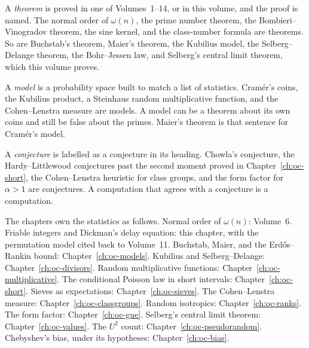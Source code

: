 A \emph{theorem} is proved in one of Volumes~1--14, or in this volume, and the proof is named. The normal order of $\omega(n)$, the prime number theorem, the Bombieri--Vinogradov theorem, the sine kernel, and the class-number formula are theorems. So are Buchstab's theorem, Maier's theorem, the Kubilius model, the Selberg--Delange theorem, the Bohr--Jessen law, and Selberg's central limit theorem, which this volume proves.

A \emph{model} is a probability space built to match a list of statistics. Cram\'er's coins, the Kubilius product, a Steinhaus random multiplicative function, and the Cohen--Lenstra measure are models. A model can be a theorem about its own coins and still be false about the primes. Maier's theorem is that sentence for Cram\'er's model.

A \emph{conjecture} is labelled as a conjecture in its heading. Chowla's conjecture, the Hardy--Littlewood conjectures past the second moment proved in Chapter~\ref{ch:oc-short}, the Cohen--Lenstra heuristic for class groups, and the form factor for $\alpha>1$ are conjectures. A computation that agrees with a conjecture is a computation.

The chapters own the statistics as follows. Normal order of $\omega(n)$: Volume~6. Friable integers and Dickman's delay equation: this chapter, with the permutation model cited back to Volume~11. Buchstab, Maier, and the Erd\H os--Rankin bound: Chapter~\ref{ch:oc-models}. Kubilius and Selberg--Delange: Chapter~\ref{ch:oc-divisors}. Random multiplicative functions: Chapter~\ref{ch:oc-multiplicative}. The conditional Poisson law in short intervals: Chapter~\ref{ch:oc-short}. Sieves as expectations: Chapter~\ref{ch:oc-sieves}. The Cohen--Lenstra measure: Chapter~\ref{ch:oc-classgroups}. Random isotropics: Chapter~\ref{ch:oc-ranks}. The form factor: Chapter~\ref{ch:oc-gue}. Selberg's central limit theorem: Chapter~\ref{ch:oc-values}. The $U^2$ count: Chapter~\ref{ch:oc-pseudorandom}. Chebyshev's bias, under its hypotheses: Chapter~\ref{ch:oc-bias}.


